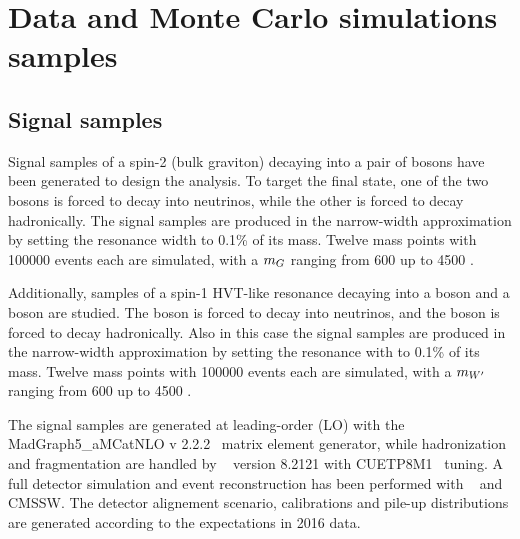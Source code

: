 \section{Data and Monte Carlo simulations samples}
\label{sec:samples}

\subsection{Signal samples}

Signal samples of a spin-2 (bulk graviton) decaying into a pair of \Z bosons have been generated to design the analysis. To target the final state, one of the two \Z bosons is forced to decay into neutrinos, while the other \Z is forced to decay hadronically. The signal samples are produced in the narrow-width approximation by setting the resonance width to 0.1\% of its mass. Twelve mass points with 100000 events each are simulated, with a $m_{G}$ ranging from 600 \GeV up to 4500 \GeV.

\noindent Additionally, samples of a spin-1 HVT-like \Wp resonance decaying into a \Z boson and a \W boson are studied. The \Z boson is forced to decay into neutrinos, and the \W boson is forced to decay hadronically. Also in this case the signal samples are produced in the narrow-width approximation by setting the resonance with to 0.1\% of its mass. Twelve mass points with 100000 events each are simulated, with a $m_{W'}$ ranging from 600 \GeV up to 4500 \GeV.

\noindent The signal samples are generated at leading-order (LO) with the {\sc MadGraph5\_aMCatNLO v 2.2.2}~\cite{bib:MADGRAPH} matrix element generator, while hadronization and fragmentation are handled by ~\cite{bib:PYTHIA} version 8.2121 with CUETP8M1~\cite{bib:CUETP8M1} tuning. A full detector simulation and event reconstruction has been performed with \GEANTfour~\cite{bib:GEANT4} and CMSSW. The detector alignement scenario, calibrations and pile-up distributions are generated according to the expectations in 2016 data.

